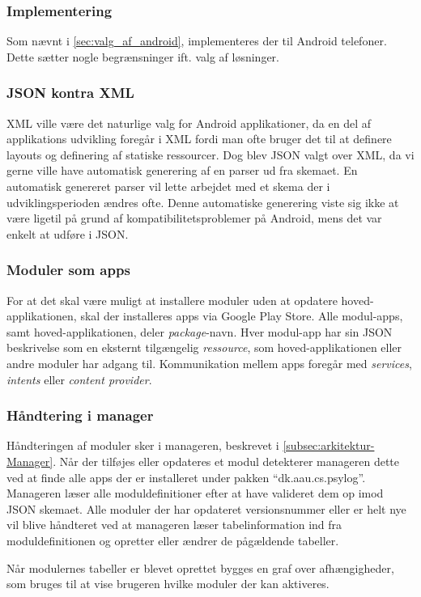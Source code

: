 \subsubsection{Implementering}
Som nævnt i \cref{sec:valg_af_android}, implementeres der til Android telefoner.
Dette sætter nogle begrænsninger ift. valg af løsninger.

\subsubsection{JSON kontra XML}
XML ville være det naturlige valg for Android applikationer, da en del af applikations udvikling foregår i XML fordi man ofte bruger det til at definere layouts og definering af statiske ressourcer. 
Dog blev JSON valgt over XML, da vi gerne ville have automatisk generering af en parser ud fra skemaet.
En automatisk genereret parser vil lette arbejdet med et skema der i udviklingsperioden ændres ofte.
Denne automatiske generering viste sig ikke at være ligetil på grund af kompatibilitetsproblemer på Android, mens det var enkelt at udføre i JSON.

\subsubsection{Moduler som apps}
For at det skal være muligt at installere moduler uden at opdatere hoved-applikationen, skal der installeres apps via Google Play Store.
Alle modul-apps, samt hoved-applikationen, deler \textit{package}-navn.
Hver modul-app har sin JSON beskrivelse som en eksternt tilgængelig \textit{ressource}, som hoved-applikationen eller andre moduler har adgang til.
Kommunikation mellem apps foregår med \textit{services}, \textit{intents} eller \textit{content provider}.

\subsubsection{Håndtering i manager}
Håndteringen af moduler sker i manageren, beskrevet i \cref{subsec:arkitektur-Manager}.
Når der tilføjes eller opdateres et modul detekterer manageren dette ved at finde alle apps der er installeret under pakken ``dk.aau.cs.psylog''.
Manageren læser alle moduldefinitioner efter at have valideret dem op imod JSON skemaet.
Alle moduler der har opdateret versionsnummer eller er helt nye vil blive håndteret ved at manageren læser tabelinformation ind fra moduldefinitionen og opretter eller ændrer de pågældende tabeller.

Når modulernes tabeller er blevet oprettet bygges en graf over afhængigheder, som bruges til at vise brugeren hvilke moduler der kan aktiveres.
